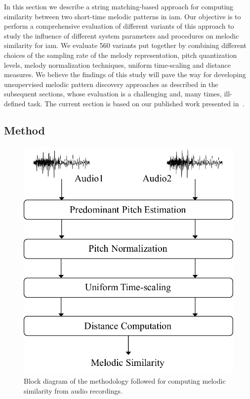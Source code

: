 

In this section we describe a string matching-based approach for computing similarity between two short-time melodic patterns in \gls{iam}. Our objective is to perform a comprehensive evaluation of different variants of this approach to study the influence of different system parameters and procedures on melodic similarity for \gls{iam}. We evaluate 560 variants put together by combining different choices of the sampling rate of the melody representation, pitch quantization levels, melody normalization techniques, uniform time-scaling and distance measures. We believe the findings of this study will pave the way for developing unsupervised melodic pattern discovery approaches as described in the subsequent sections, whose evaluation is a challenging and, many times, ill-defined task. The current section is based on our published work presented in~\cite{gulati_ICASSP2015}.

\subsection{Method}
\label{sec:method_similarity_evaluation}


\begin{figure}
	\begin{center}
		\includegraphics[width=\figSizeSixty]{ch06_patterns/figures/SimilarityEvaluation/melodic_similarity_blockd.pdf}
	\end{center}
	\caption[Block diagram for computing melodic similarity]{Block diagram of the methodology followed for computing melodic similarity from audio recordings.}
	\label{fig:block_diagram_melodic_similarity}
\end{figure}


